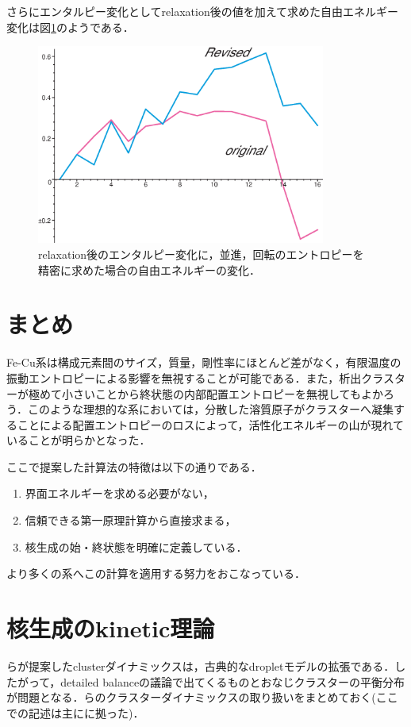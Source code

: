 \documentclass[a4j,10pt]{jarticle}
\begin{document}
さらにエンタルピー変化としてrelaxation後の値を加えて求めた自由エネルギー変化は図\ref{FreeEnergyRev2}のようである．
\begin{figure}\begin{center}
\includegraphics[width=95mm]{./figs/FreeEnergyRev2.eps}
\caption{relaxation後のエンタルピー変化に，並進，回転のエントロピーを精密に求めた場合の自由エネルギーの変化．}
\label{FreeEnergyRev2}
\end{center}\end{figure}

\section{まとめ}
Fe-Cu系は構成元素間のサイズ，質量，剛性率にほとんど差がなく，有限温度の振動エントロピーによる影響を無視することが可能である．また，析出クラスターが極めて小さいことから終状態の内部配置エントロピーを無視してもよかろう．このような理想的な系においては，分散した溶質原子がクラスターへ凝集することによる配置エントロピーのロスによって，活性化エネルギーの山が現れていることが明らかとなった．

ここで提案した計算法の特徴は以下の通りである．
\begin{enumerate}
\item 界面エネルギーを求める必要がない，
\item 信頼できる第一原理計算から直接求まる，
\item 核生成の始・終状態を明確に定義している．
\end{enumerate}
より多くの系へこの計算を適用する努力をおこなっている．

\appendix
\section{核生成のkinetic理論}
\cite{BinderStauffer:1976}らが提案したclusterダイナミックスは，古典的なdropletモデルの拡張である．したがって，detailed balanceの議論で出てくるものとおなじクラスターの平衡分布が問題となる．\cite{BeckerDoring:1935}らのクラスターダイナミックスの取り扱いをまとめておく(ここでの記述は主に\cite{Russel:1980}に拠った)．
\end{document}
